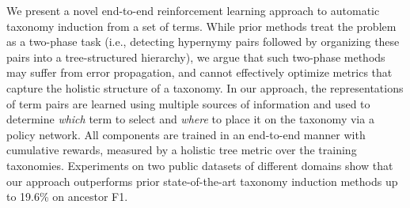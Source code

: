 We present a novel end-to-end reinforcement learning approach to automatic taxonomy induction from a set of terms. While prior methods treat the problem as a two-phase task (i.e., detecting hypernymy pairs followed by organizing these pairs into a tree-structured hierarchy), we argue that such two-phase methods may suffer from error propagation, and cannot effectively optimize metrics that capture the holistic structure of a taxonomy. In our approach, the representations of term pairs are learned using multiple sources of information and used to determine \textit{which} term to select and \textit{where} to place it on the taxonomy via a policy network. All components are trained in an end-to-end manner with cumulative rewards, measured by a holistic tree metric over the training taxonomies. Experiments on two public datasets of different domains show that our approach outperforms prior state-of-the-art taxonomy induction methods up to 19.6\% on ancestor F1.
